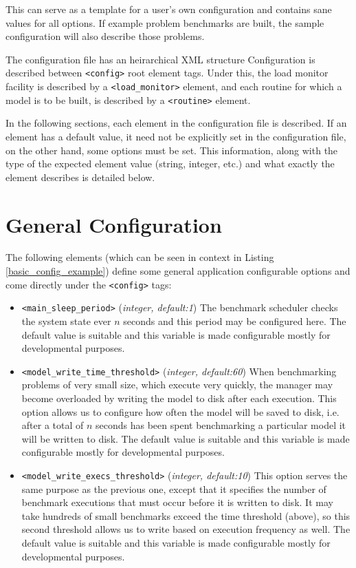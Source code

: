 \documentclass[a4paper,12pt]{report}
\newcommand{\devvar}{The default value is suitable and this variable is made configurable mostly for developmental purposes}
\begin{document}
    \noindent This can serve as a template for a user's own configuration and
    contains sane values for all options. If example problem benchmarks are
    built, the sample configuration will also describe those problems.
    
    The configuration file has an heirarchical XML structure Configuration is
    described between \verb+<config>+ root element tags.  Under this, the load
    monitor facility is described by a \verb+<load_monitor>+ element, and each
    routine for which a model is to be built, is described by a 
    \verb+<routine>+ element.

    In the following sections, each element in the configuration file is
    described. If an element has a default value, it need not be explicitly set
    in the configuration file, on the other hand, some options must be set.
    This information, along with the type of the expected element value
    (string, integer, etc.) and what exactly the element describes is detailed
    below.

    \section{General Configuration}
    The following elements (which can be seen in context in Listing
    \ref{basic_config_example}) define some general application configurable
    options and come directly under the \verb+<config>+ tags:
    \begin{itemize}
        \item \verb+<main_sleep_period>+ (\emph{integer, default:1}) The
            benchmark scheduler checks the system state ever $n$ seconds and
            this period may be configured here. \devvar.
        \item \verb+<model_write_time_threshold>+ (\emph{integer, default:60})
            When benchmarking problems of very small size, which execute very
            quickly, the manager may become overloaded by writing the model to
            disk after each execution. This option allows us to configure how
            often the model will be saved to disk, i.e. after a total of $n$
            seconds has been spent benchmarking a particular model it will be
            written to disk.  \devvar.
        \item \verb+<model_write_execs_threshold>+ (\emph{integer, default:10})
            This option serves the same purpose as the previous one, except
            that it specifies the number of benchmark executions that must
            occur before it is written to disk.  It may take hundreds of small
            benchmarks exceed the time threshold (above), so this second
            threshold allows us to write based on execution frequency as well.
            \devvar.
    \end{itemize}
\end{document}
